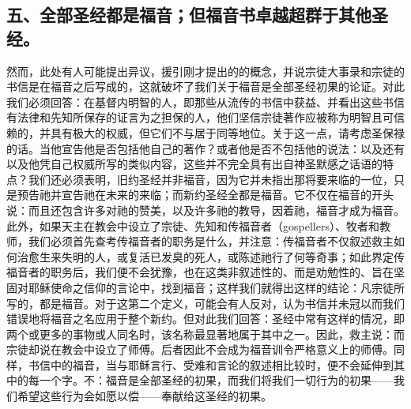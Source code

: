 
\subsection{五、全部圣经都是福音；但福音书卓越超群于其他圣经。}

然而，此处有人可能提出异议，援引刚才提出的的概念，并说宗徒大事录和宗徒的书信是在福音之后写成的，这就破坏了我们关于福音是全部圣经初果的论证。对此我们必须回答：在基督内明智的人，即那些从流传的书信中获益、并看出这些书信有法律和先知所保存的证言为之担保的人，他们坚信宗徒著作应被称为明智且可信赖的，并具有极大的权威，但它们不与居于同等地位。关于这一点，请考虑圣保禄的话。当他宣告他是否包括他自己的著作？或者他是否不包括他的说法：以及还有以及他凭自己权威所写的类似内容，这些并不完全具有出自神圣默感之话语的特点？我们还必须表明，旧约圣经并非福音，因为它并未指出那将要来临的一位，只是预告祂并宣告祂在未来的来临；而新约圣经全都是福音。它不仅在福音的开头说：而且还包含许多对祂的赞美，以及许多祂的教导，因着祂，福音才成为福音。此外，如果天主在教会中设立了宗徒、先知和传福音者（gospellers）、牧者和教师，我们必须首先查考传福音者的职务是什么，并注意：传福音者不仅叙述救主如何治愈生来失明的人，或复活已发臭的死人，或陈述祂行了何等奇事；如此界定传福音者的职务后，我们便不会犹豫，也在这类非叙述性的、而是劝勉性的、旨在坚固对耶稣使命之信仰的言论中，找到福音；这样我们就得出这样的结论：凡宗徒所写的，都是福音。对于这第二个定义，可能会有人反对，认为书信并未冠以而我们错误地将福音之名应用于整个新约。但对此我们回答：圣经中常有这样的情况，即两个或更多的事物或人同名时，该名称最显著地属于其中之一。因此，救主说：而宗徒却说在教会中设立了师傅。后者因此不会成为福音训令严格意义上的师傅。同样，书信中的福音，当与耶稣言行、受难和言论的叙述相比较时，便不会延伸到其中的每一个字。不：福音是全部圣经的初果，而我们将我们一切行为的初果——我们希望这些行为会如愿以偿——奉献给这圣经的初果。\par


